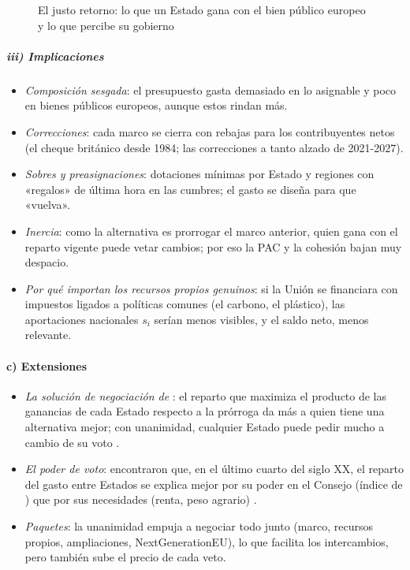 \documentclass[11pt]{article}
\begin{document}
\begin{figure}[H]
\centering
\caption{El justo retorno: lo que un Estado gana con el bien público europeo y lo que percibe su gobierno}\label{fig:justo-retorno}
\end{figure}

\subparagraph{iii) Implicaciones}

\begin{itemize}
\item \emph{Composición sesgada}: el presupuesto gasta demasiado en lo asignable y poco en bienes públicos europeos, aunque estos rindan más.
\item \emph{Correcciones}: cada marco se cierra con rebajas para los contribuyentes netos (el cheque británico desde 1984; las correcciones a tanto alzado de 2021-2027).
\item \emph{Sobres y preasignaciones}: dotaciones mínimas por Estado y regiones con «regalos» de última hora en las cumbres; el gasto se diseña para que «vuelva».
\item \emph{Inercia}: como la alternativa es prorrogar el marco anterior, quien gana con el reparto vigente puede vetar cambios; por eso la PAC y la cohesión bajan muy despacio.
\item \emph{Por qué importan los recursos propios genuinos}: si la Unión se financiara con impuestos ligados a políticas comunes (el carbono, el plástico), las aportaciones nacionales $s_i$ serían menos visibles, y el saldo neto, menos relevante.
\end{itemize}

\paragraph{c) Extensiones}

\begin{itemize}
\item \emph{La solución de negociación de }\nocite{Nash1950Bargaining}: el reparto que maximiza el producto de las ganancias de cada Estado respecto a la prórroga da más a quien tiene una alternativa mejor; con unanimidad, cualquier Estado puede pedir mucho a cambio de su voto .
\item \emph{El poder de voto}: \textcite{KauppiWidgren2004} encontraron que, en el último cuarto del siglo XX, el reparto del gasto entre Estados se explica mejor por su poder en el Consejo (índice de ) que por sus necesidades (renta, peso agrario) .
\item \emph{Paquetes}: la unanimidad empuja a negociar todo junto (marco, recursos propios, ampliaciones, NextGenerationEU), lo que facilita los intercambios, pero también sube el precio de cada veto.
\end{itemize}
\end{document}
